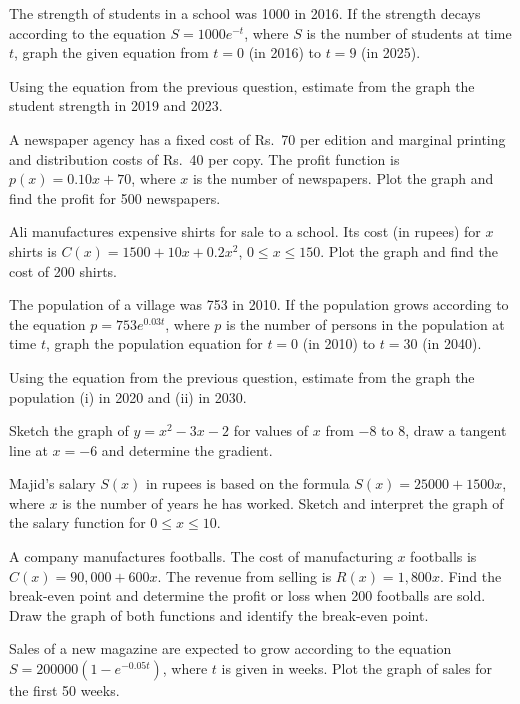\documentclass[11pt]{article}
\begin{document}
\begin{wq}[start=287]
\item The strength of students in a school was 1000 in 2016. If the strength decays according to the equation $S=1000e^{-t}$, where $S$ is the number of students at time $t$, graph the given equation from $t=0$ (in 2016) to $t=9$ (in 2025).

\item Using the equation from the previous question, estimate from the graph the student strength in 2019 and 2023.

\item A newspaper agency has a fixed cost of Rs.\ 70 per edition and marginal printing and distribution costs of Rs.\ 40 per copy. The profit function is $p(x)=0.10x+70$, where $x$ is the number of newspapers. Plot the graph and find the profit for 500 newspapers.

\item Ali manufactures expensive shirts for sale to a school. Its cost (in rupees) for $x$ shirts is $C(x)=1500+10x+0.2x^2$, $0\le x\le 150$. Plot the graph and find the cost of 200 shirts.

\item The population of a village was 753 in 2010. If the population grows according to the equation $p=753e^{0.03t}$, where $p$ is the number of persons in the population at time $t$, graph the population equation for $t=0$ (in 2010) to $t=30$ (in 2040).

\item Using the equation from the previous question, estimate from the graph the population (i) in 2020 and (ii) in 2030.

\item Sketch the graph of $y=x^2-3x-2$ for values of $x$ from $-8$ to $8$, draw a tangent line at $x=-6$ and determine the gradient.

\item Majid's salary $S(x)$ in rupees is based on the formula $S(x)=25000+1500x$, where $x$ is the number of years he has worked. Sketch and interpret the graph of the salary function for $0\le x\le 10$.

\item A company manufactures footballs. The cost of manufacturing $x$ footballs is $C(x)=90{,}000+600x$. The revenue from selling is $R(x)=1{,}800x$. Find the break-even point and determine the profit or loss when 200 footballs are sold. Draw the graph of both functions and identify the break-even point.

\item Sales of a new magazine are expected to grow according to the equation $S=200000(1-e^{-0.05t})$, where $t$ is given in weeks. Plot the graph of sales for the first 50 weeks.


\end{wq}
\end{document}
